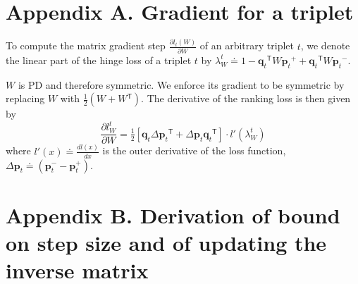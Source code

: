 \documentclass[twoside,11pt]{article}
\newcommand\mat[1]{{#1}}
\renewcommand\vec[1]{\mathbf{#1}}
\newcommand{\T}{{}^\mathsf{T}}
\newcommand{\W}{\mat{W}}
\newcommand{\eqdef}{\doteq}
\newcommand{\ignore}[1]{}
\newcommand{\q}{{\vec{q}}}
\newcommand{\p}{{\vec{p}}}
\newcommand{\trip}{{t}}
\newcommand{\qt}{{\q_{\trip}}}
\newcommand{\pt}{{\p_{\trip}}}
\begin{document}


\ignore{We would like to thank Prof. Tim Davis for fruitful discussions and for his assistance with utilizing the Cholesky decomposition row-column updates with the CHOLMOD solver.} 

\newpage

\appendix
\section*{Appendix A. Gradient for a triplet}
\label{appendix-grad}

To compute the matrix gradient step $\frac{\partial {l_t (\W)}}{\partial \W}$ of an arbitrary triplet $t$, we denote the linear part of the hinge loss of a triplet $t$ by $\lambda_{W}^t \eqdef 
1-\qt\T \W \pt^{+} + \qt\T\W\pt^{-}.$

$\W$ is PD and therefore symmetric. We enforce its gradient to be symmetric by replacing $\W$ with $\tfrac{1}{2}(\W + \W\T)$.
The derivative of the ranking loss is then given by
\begin{equation}
\frac{\partial {l_{\W}^{t}}}{\partial \W} = \tfrac{1}{2}[\vec{q}_{t}\Delta\vec{p}_{t}\T  + \Delta\vec{p}_{t}\vec{q}_{t}\T]\cdot {l'}(\lambda_{W}^t)
\label{dlossranking}
\nonumber 
\end{equation} where $l'(x) \eqdef \frac{d{l(x)}}{dx}$ is the outer derivative of the loss function, $\Delta\vec{p}_{t} \eqdef (\vec{p}_{t}^{-} - \vec{p}_{t}^{+})$.

\section*{Appendix B. Derivation of bound on step size and of updating the inverse matrix}
\label{appendix-inverse}
\end{document}
